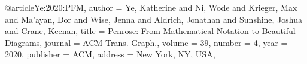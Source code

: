 @article{Ye:2020:PFM,
  author = {Ye, Katherine and Ni, Wode and Krieger, Max and Ma'ayan, Dor and Wise, Jenna and Aldrich, Jonathan and Sunshine, Joshua and Crane, Keenan},
  title = {Penrose: From Mathematical Notation to Beautiful Diagrams},
  journal = {ACM Trans. Graph.},
  volume = {39},
  number = {4},
  year = {2020},
  publisher = {ACM},
  address = {New York, NY, USA},
}